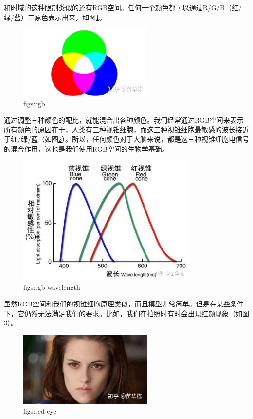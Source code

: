 \documentclass[lang=cn,11pt,a4paper,cite=numbers]{elegantpaper}
\begin{document}
  和时域的这种限制类似的还有RGB空间。任何一个颜色都可以通过R/G/B（红/绿/蓝）三原色表示出来，如图\ref{figs:rgb}。
\begin{figure}[!htb]
  \centering
  \includegraphics[width=0.6\textwidth]{figs/rgb.png}
  \caption{figs:rgb}
  \label{figs:rgb}
\end{figure}
通过调整三种颜色的配比，就能混合出各种颜色。我们经常通过RGB空间来表示所有颜色的原因在于，人类有三种视锥细胞，而这三种视锥细胞最敏感的波长接近于红/绿/蓝（如图\ref{figs:rgb-wavelength}）。所以，任何颜色对于大脑来说，都是这三种视锥细胞电信号的混合作用，这也是我们使用RGB空间的生物学基础。
\begin{figure}[!htb]
  \centering
  \includegraphics[width=0.8\textwidth]{figs/rgb-wavelength.png}
  \caption{figs:rgb-wavelength}
  \label{figs:rgb-wavelength}
\end{figure}

  虽然RGB空间和我们的视锥细胞原理类似，而且模型非常简单。但是在某些条件下，它仍然无法满足我们的要求。比如，我们在拍照时有时会出现红颜现象（如图\ref{figs:red-eye}）。
\begin{figure}[!htb]
  \centering
  \includegraphics[width=0.6\textwidth]{figs/red-eye.png}
  \caption{figs:red-eye}
  \label{figs:red-eye}
\end{figure}
\end{document}
